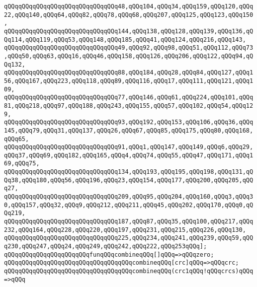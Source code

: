 \verb|qQQqqQQqqQQqqQQqqQQqqQQqqQQqqQQq48,qQQq104,qQQq34,qQQq159,qQQq120,qQQq22,qQQq140,qQQq64,qQQq82,qQQq78,qQQq68,qQQq207,qQQq125,qQQq123,qQQq150,|\newline
\verb|qQQqqQQqqQQqqQQqqQQqqQQqqQQqqQQq144,qQQq138,qQQq128,qQQq139,qQQq136,qQQq114,qQQq119,qQQq53,qQQq148,qQQq185,qQQq41,qQQq124,qQQq216,qQQq143,|\newline
\verb|qQQqqQQqqQQqqQQqqQQqqQQqqQQqqQQq49,qQQq92,qQQq98,qQQq51,qQQq112,qQQq73,qQQq50,qQQq63,qQQq16,qQQq46,qQQq158,qQQq126,qQQq206,qQQq122,qQQq94,qQQq132,|\newline
\verb|qQQqqQQqqQQqqQQqqQQqqQQqqQQqqQQq88,qQQq184,qQQq28,qQQq84,qQQq127,qQQq156,qQQq167,qQQq223,qQQq118,qQQq89,qQQq116,qQQq17,qQQq111,qQQq121,qQQq109,|\newline
\verb|qQQqqQQqqQQqqQQqqQQqqQQqqQQqqQQq77,qQQq146,qQQq61,qQQq224,qQQq101,qQQq81,qQQq218,qQQq97,qQQq188,qQQq243,qQQq155,qQQq57,qQQq102,qQQq54,qQQq129,|\newline
\verb|qQQqqQQqqQQqqQQqqQQqqQQqqQQqqQQq93,qQQq192,qQQq153,qQQq106,qQQq36,qQQq145,qQQq79,qQQq31,qQQq137,qQQq26,qQQq67,qQQq85,qQQq175,qQQq80,qQQq168,qQQq65,|\newline
\verb|qQQqqQQqqQQqqQQqqQQqqQQqqQQqqQQq91,qQQq1,qQQq147,qQQq149,qQQq6,qQQq29,qQQq37,qQQq69,qQQq182,qQQq165,qQQq4,qQQq74,qQQq55,qQQq47,qQQq171,qQQq169,qQQq75,|\newline
\verb|qQQqqQQqqQQqqQQqqQQqqQQqqQQqqQQq134,qQQq193,qQQq195,qQQq198,qQQq131,qQQq38,qQQq180,qQQq56,qQQq196,qQQq23,qQQq154,qQQq177,qQQq200,qQQq205,qQQq27,|\newline
\verb|qQQqqQQqqQQqqQQqqQQqqQQqqQQqqQQq209,qQQq95,qQQq204,qQQq160,qQQq3,qQQq30,qQQq157,qQQq32,qQQq9,qQQq212,qQQq211,qQQq45,qQQq202,qQQq170,qQQq0,qQQq219,|\newline
\verb|qQQqqQQqqQQqqQQqqQQqqQQqqQQqqQQq187,qQQq87,qQQq35,qQQq100,qQQq217,qQQq232,qQQq164,qQQq228,qQQq220,qQQq197,qQQq231,qQQq215,qQQq226,qQQq130,|\newline
\verb|qQQqqQQqqQQqqQQqqQQqqQQqqQQqqQQq225,qQQq234,qQQq241,qQQq239,qQQq59,qQQq230,qQQq247,qQQq24,qQQq249,qQQq242,qQQq222,qQQq253qQQq];|\newline
\newline
\newline
\verb|qQQqqQQqqQQqqQQqqQQqqQQqfunqQQqcombineqQQq[]qQQq=>qQQqzero;|\newline
\verb|qQQqqQQqqQQqqQQqqQQqqQQqqQQqqQQqqQQqcombineqQQq[crc]qQQq=>qQQqcrc;|\newline
\verb|qQQqqQQqqQQqqQQqqQQqqQQqqQQqqQQqqQQqcombineqQQq(crc1qQQq!qQQqcrcs)qQQq=>qQQq|\newline
